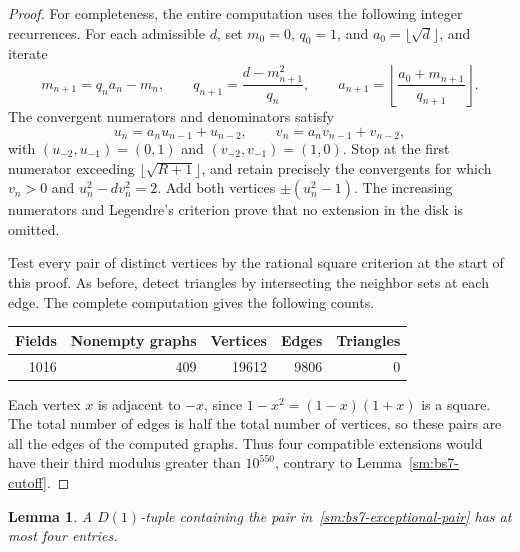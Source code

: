 \documentclass[12pt]{article}
\newtheorem{lemma}[theorem]{Lemma}
\numberwithin{equation}{section}
\begin{document}
\begin{proof}
For completeness, the entire computation uses the following integer recurrences. For each admissible $d$, set $m_0=0$, $q_0=1$, and $a_0=\lfloor\sqrt d\rfloor$, and iterate
\begin{equation*}
 m_{n+1}=q_na_n-m_n,\qquad
 q_{n+1}=\frac{d-m_{n+1}^2}{q_n},\qquad
 a_{n+1}=\left\lfloor\frac{a_0+m_{n+1}}{q_{n+1}}\right\rfloor.
\end{equation*}
The convergent numerators and denominators satisfy
\begin{equation*}
 u_n=a_nu_{n-1}+u_{n-2},\qquad
 v_n=a_nv_{n-1}+v_{n-2},
\end{equation*}
with $(u_{-2},u_{-1})=(0,1)$ and $(v_{-2},v_{-1})=(1,0)$.
Stop at the first numerator exceeding $\lfloor\sqrt{R+1}\rfloor$, and retain precisely the convergents for which $v_n>0$ and $u_n^2-dv_n^2=2$. Add both vertices $\pm(u_n^2-1)$. The increasing numerators and Legendre's criterion prove that no extension in the disk is omitted.

Test every pair of distinct vertices by the rational square criterion at the start of this proof. As before, detect triangles by intersecting the neighbor sets at each edge. The complete computation gives the following counts.
\begin{center}
\begin{tabular}{rrrrr}
\toprule
Fields & Nonempty graphs & Vertices & Edges & Triangles\\
\midrule
1016 &409 &19612 &9806 &0\\
\bottomrule
\end{tabular}
\end{center}
Each vertex $x$ is adjacent to $-x$, since
$1-x^2=(1-x)(1+x)$ is a square. The total number of edges is half
the total number of vertices, so these pairs are all the edges of
the computed graphs.
Thus four compatible extensions would have their third modulus greater than $10^{550}$, contrary to Lemma~\ref{sm:bs7-cutoff}.
\end{proof}
\begin{lemma}\label{sm:bs7-eisenstein}
A $D(1)$-tuple containing the pair in~\eqref{sm:bs7-exceptional-pair} has at most four entries.
\end{lemma}
\end{document}
